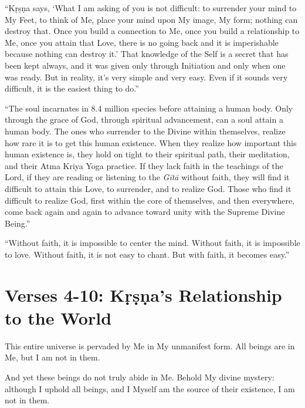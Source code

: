 \enquote{Kṛṣṇa says, \enquote{What I am asking of you is not difficult: to surrender your mind to My Feet, to think of Me, place your mind upon My image, My form; nothing can destroy that. Once you build a connection to Me, once you build a relationship to Me, once you attain that Love, there is no going back and it is imperishable because nothing can destroy it.} That knowledge of the Self is a secret that has been kept always, and it was given only through Initiation and only when one was ready. But in reality, it’s very simple and very easy. Even if it sounds very difficult, it is the easiest thing to do.}

\enquote{The soul incarnates in 8.4 million species before attaining a human body. Only through the grace of God, through spiritual advancement, can a soul attain a human body. The ones who surrender to the Divine within themselves, realize how rare it is to get this human existence. When they realize how important this human existence is, they hold on tight to their spiritual path, their meditation, and their Atma Kriya Yoga practice. If they lack faith in the teachings of the Lord, if they are reading or listening to the \textit{Gītā} without faith, they will find it difficult to attain this Love, to surrender, and to realize God. Those who find it difficult to realize God, first within the core of themselves, and then everywhere, come back again and again to advance toward unity with the Supreme Divine Being.}

\enquote{Without faith, it is impossible to center the mind. Without faith, it is impossible to love. Without faith, it is not easy to chant. But with faith, it becomes easy.}

\section{Verses 4-10: Kṛṣṇa's Relationship to the World}\label{sec-verses-4-10-krsna-s-relationship-to-the-world}

{This entire universe is pervaded by Me in My unmanifest form. All beings are in Me, but I am not in them.}

{And yet these beings do not truly abide in Me. Behold My divine mystery: although I uphold all beings, and I Myself am the source of their existence, I am not in them.}

